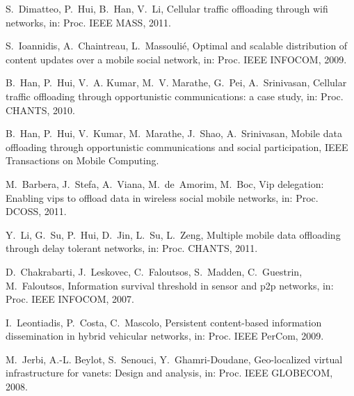 \documentclass[preprint]{elsarticle}
\begin{document}
\begin{thebibliography}{10}
S.~Dimatteo, P.~Hui, B.~Han, V.~Li, Cellular traffic offloading through wifi
  networks, in: Proc. {IEEE MASS}, 2011.

S.~Ioannidis, A.~Chaintreau, L.~Massouli\'e, Optimal and scalable distribution
  of content updates over a mobile social network, in: Proc. {IEEE INFOCOM},
  2009.

B.~Han, P.~Hui, V.~A. Kumar, M.~V. Marathe, G.~Pei, A.~Srinivasan, Cellular
  traffic offloading through opportunistic communications: a case study, in:
  Proc. CHANTS, 2010.

B.~Han, P.~Hui, V.~Kumar, M.~Marathe, J.~Shao, A.~Srinivasan, Mobile data
  offloading through opportunistic communications and social participation,
  IEEE Transactions on Mobile Computing.

M.~Barbera, J.~Stefa, A.~Viana, M.~de~Amorim, M.~Boc, Vip delegation: Enabling
  vips to offload data in wireless social mobile networks, in: Proc. DCOSS,
  2011.

Y.~Li, G.~Su, P.~Hui, D.~Jin, L.~Su, L.~Zeng, Multiple mobile data offloading
  through delay tolerant networks, in: Proc. CHANTS, 2011.

D.~Chakrabarti, J.~Leskovec, C.~Faloutsos, S.~Madden, C.~Guestrin,
  M.~Faloutsos, Information survival threshold in sensor and p2p networks, in:
  Proc. {IEEE INFOCOM}, 2007.

I.~Leontiadis, P.~Costa, C.~Mascolo, Persistent content-based information
  dissemination in hybrid vehicular networks, in: Proc. {IEEE PerCom}, 2009.

M.~Jerbi, A.-L. Beylot, S.~Senouci, Y.~Ghamri-Doudane, Geo-localized virtual
  infrastructure for vanets: Design and analysis, in: Proc. {IEEE GLOBECOM},
  2008.

\end{thebibliography}
\end{document}
